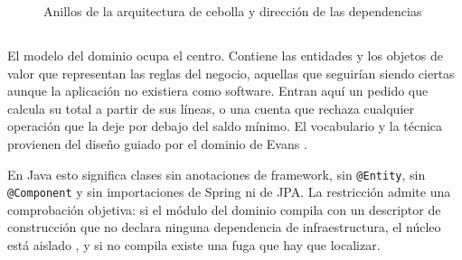 \documentclass[10pt,a4paper]{article}
\begin{document}
\begin{figure}[H]
	\centering
	\caption{Anillos de la arquitectura de cebolla y dirección de las dependencias}
	\label{img:cebolla}
\end{figure}

\subsection{ \color{colorESCOM}{Modelo del dominio}}

El modelo del dominio ocupa el centro. Contiene las entidades y los objetos de valor que representan las reglas del negocio, aquellas que seguirían siendo ciertas aunque la aplicación no existiera como software. Entran aquí un pedido que calcula su total a partir de sus líneas, o una cuenta que rechaza cualquier operación que la deje por debajo del saldo mínimo. El vocabulario y la técnica provienen del diseño guiado por el dominio de Evans \cite{evans2003}.

En Java esto significa clases sin anotaciones de framework, sin \texttt{@Entity}, sin \texttt{@Component} y sin importaciones de Spring ni de JPA. La restricción admite una comprobación objetiva: si el módulo del dominio compila con un descriptor de construcción que no declara ninguna dependencia de infraestructura, el núcleo está aislado \cite{foojay2023}, y si no compila existe una fuga que hay que localizar.
\end{document}
